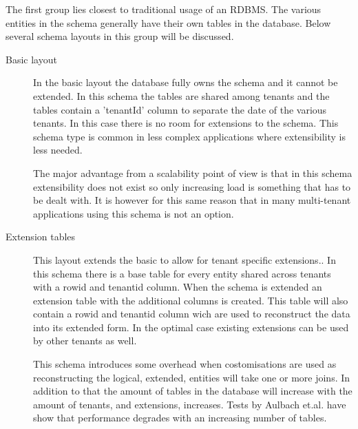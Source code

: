 The first group lies closest to traditional usage of an RDBMS. 
The various entities in the schema generally have their own tables in the database.
Below several schema layouts in this group will be discussed.
\begin{description}
	\item[Basic layout] In the basic layout the database fully owns the schema and it cannot be extended. 
		In this schema the tables are shared among tenants and the tables contain a 'tenantId' column to separate the date of the various tenants.
		In this case there is no room for extensions to the schema. 
		This schema type is common in less complex applications where extensibility is less needed. \cite{aulbach2008multi}
		
		The major advantage from a scalability point of view is that in this schema extensibility does not exist so only increasing load is something that has to be dealt with.
		It is however for this same reason that in many multi-tenant applications using this schema is not an option.
	\item[Extension tables]
		This layout extends the basic to allow for tenant specific extensions..
		In this schema there is a base table for every entity shared across tenants with a rowid and tenantid column.
		When the schema is extended an extension table with the additional columns is created.
		This table will also contain a rowid and tenantid column wich are used to reconstruct the data into its extended form.
		In the optimal case existing extensions can be used by other tenants as well.

		This schema introduces some overhead when costomisations are used as reconstructing the logical, extended, entities will take one or more joins. 
		In addition to that the amount of tables in the database will increase with the amount of tenants, and extensions, increases. Tests by Aulbach et.al. have show that performance degrades with an increasing number of tables.\cite{aulbach2008multi}
\end{description}

